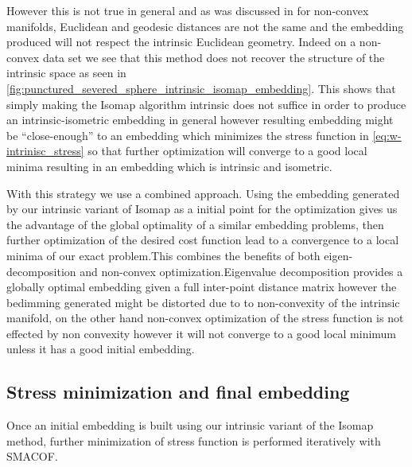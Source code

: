 	However this is not true in general and as was discussed in \cite{rosman2010nonlinear} for non-convex manifolds, Euclidean and geodesic distances are not the same and the embedding produced will not respect the intrinsic Euclidean geometry. Indeed on a non-convex data set we see that this method does not recover the structure of the intrinsic space as seen in \cref{fig:punctured_severed_sphere_intrinsic_isomap_embedding}. This shows that simply making the Isomap algorithm intrinsic does not suffice in order to produce an intrinsic-isometric embedding in general however resulting embedding might be ``close-enough'' to an embedding which minimizes the stress function in \cref{eq:w-intrinisc_stress} so that further optimization will converge to a good local minima resulting in an embedding which is intrinsic and isometric.
	
	With this strategy we use a combined approach. Using the embedding generated by our intrinsic variant of Isomap as a initial point for the optimization gives us the advantage of the global optimality of a similar embedding problems, then further optimization of the desired cost function lead to a convergence to a local minima of our exact	problem.This combines the benefits of both eigen-decomposition and non-convex optimization.Eigenvalue decomposition provides a globally optimal embedding given a full inter-point distance matrix however the bedimming generated might be distorted due to to non-convexity of the intrinsic manifold, on the other hand non-convex optimization of the stress function is not effected by non convexity however it will not converge to a good local minimum unless it has a good initial embedding. 
	
	\subsection{Stress minimization and final embedding}
	\label{ssec:Embedding-correction-for}
	
	Once an initial embedding is built using our intrinsic variant of the Isomap method, further minimization of stress function is performed iteratively with \ac{SMACOF}.
	
